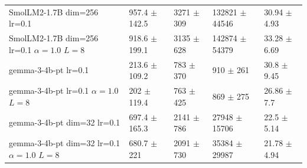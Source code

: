 \begin{tabular}{lllll}
 SmolLM2-1.7B {\small dim=256} {\small lr=0.1}                                      & 957.4 {\small $\pm$ 142.5}  & 3271 {\small $\pm$ 309}  & 132821 {\small $\pm$ 44546}   & 30.94 {\small $\pm$ 4.93}  \\
 SmolLM2-1.7B {\small dim=256} {\small lr=0.1} {\small $\alpha=1.0$} {\small $L=8$} & 918.6 {\small $\pm$ 199.1}  & 3135 {\small $\pm$ 628}  & 142874 {\small $\pm$ 54379}   & 33.28 {\small $\pm$ 6.69}  \\
 \midrule
 gemma-3-4b-pt {\small lr=0.1}                                                      & 213.6 {\small $\pm$ 109.2}  & 783 {\small $\pm$ 370}   & 910 {\small $\pm$ 261}        & 30.8 {\small $\pm$ 9.45}   \\
 gemma-3-4b-pt {\small lr=0.1} {\small $\alpha=1.0$} {\small $L=8$}                 & 202 {\small $\pm$ 119.4}    & 763 {\small $\pm$ 425}   & 869 {\small $\pm$ 275}        & 26.86 {\small $\pm$ 7.7}   \\
 gemma-3-4b-pt {\small dim=32} {\small lr=0.1}                                      & 697.4 {\small $\pm$ 165.3}  & 2141 {\small $\pm$ 786}  & 27948 {\small $\pm$ 15706}    & 22.5 {\small $\pm$ 5.14}   \\
 gemma-3-4b-pt {\small dim=32} {\small lr=0.1} {\small $\alpha=1.0$} {\small $L=8$} & 680.7 {\small $\pm$ 221}    & 2091 {\small $\pm$ 730}  & 35384 {\small $\pm$ 29987}    & 21.78 {\small $\pm$ 4.94}  \\
\bottomrule
\end{tabular}
